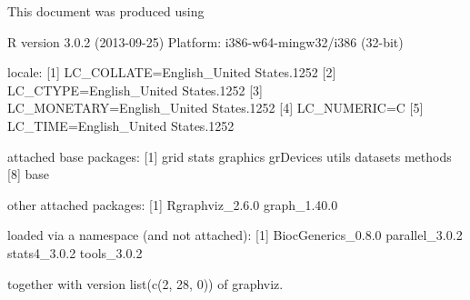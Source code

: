 \documentclass{article}
\begin{document}
This document was produced using
\begin{Schunk}
\begin{Soutput}
R version 3.0.2 (2013-09-25)
Platform: i386-w64-mingw32/i386 (32-bit)

locale:
[1] LC_COLLATE=English_United States.1252 
[2] LC_CTYPE=English_United States.1252   
[3] LC_MONETARY=English_United States.1252
[4] LC_NUMERIC=C                          
[5] LC_TIME=English_United States.1252    

attached base packages:
[1] grid      stats     graphics  grDevices utils     datasets  methods  
[8] base     

other attached packages:
[1] Rgraphviz_2.6.0 graph_1.40.0   

loaded via a namespace (and not attached):
[1] BiocGenerics_0.8.0 parallel_3.0.2     stats4_3.0.2       tools_3.0.2       
\end{Soutput}
\end{Schunk}
together with version list(c(2, 28, 0)) of graphviz.
\end{document}
